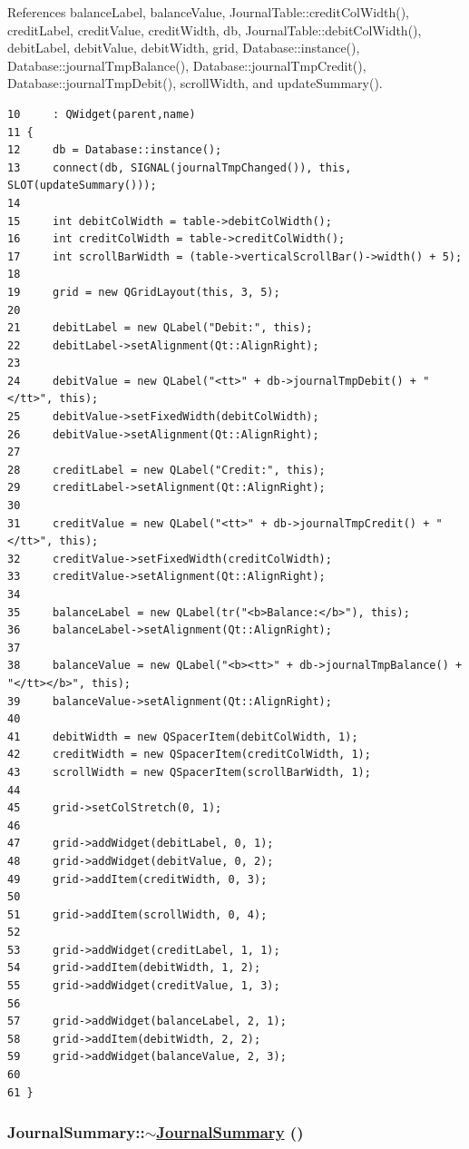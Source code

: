 References balance\-Label, balance\-Value, Journal\-Table::credit\-Col\-Width(), credit\-Label, credit\-Value, credit\-Width, db, Journal\-Table::debit\-Col\-Width(), debit\-Label, debit\-Value, debit\-Width, grid, Database::instance(), Database::journal\-Tmp\-Balance(), Database::journal\-Tmp\-Credit(), Database::journal\-Tmp\-Debit(), scroll\-Width, and update\-Summary().

\footnotesize\begin{verbatim}10     : QWidget(parent,name)
11 {
12     db = Database::instance();
13     connect(db, SIGNAL(journalTmpChanged()), this, SLOT(updateSummary()));
14     
15     int debitColWidth = table->debitColWidth();
16     int creditColWidth = table->creditColWidth();
17     int scrollBarWidth = (table->verticalScrollBar()->width() + 5);
18     
19     grid = new QGridLayout(this, 3, 5);
20     
21     debitLabel = new QLabel("Debit:", this);
22     debitLabel->setAlignment(Qt::AlignRight);
23     
24     debitValue = new QLabel("<tt>" + db->journalTmpDebit() + "</tt>", this);
25     debitValue->setFixedWidth(debitColWidth);
26     debitValue->setAlignment(Qt::AlignRight);
27     
28     creditLabel = new QLabel("Credit:", this);
29     creditLabel->setAlignment(Qt::AlignRight);
30     
31     creditValue = new QLabel("<tt>" + db->journalTmpCredit() + "</tt>", this);
32     creditValue->setFixedWidth(creditColWidth);
33     creditValue->setAlignment(Qt::AlignRight);
34     
35     balanceLabel = new QLabel(tr("<b>Balance:</b>"), this);
36     balanceLabel->setAlignment(Qt::AlignRight);
37     
38     balanceValue = new QLabel("<b><tt>" + db->journalTmpBalance() + "</tt></b>", this);
39     balanceValue->setAlignment(Qt::AlignRight);
40     
41     debitWidth = new QSpacerItem(debitColWidth, 1);
42     creditWidth = new QSpacerItem(creditColWidth, 1);
43     scrollWidth = new QSpacerItem(scrollBarWidth, 1);
44     
45     grid->setColStretch(0, 1);
46     
47     grid->addWidget(debitLabel, 0, 1);
48     grid->addWidget(debitValue, 0, 2);
49     grid->addItem(creditWidth, 0, 3);
50     
51     grid->addItem(scrollWidth, 0, 4);
52     
53     grid->addWidget(creditLabel, 1, 1);
54     grid->addItem(debitWidth, 1, 2);
55     grid->addWidget(creditValue, 1, 3);
56     
57     grid->addWidget(balanceLabel, 2, 1);
58     grid->addItem(debitWidth, 2, 2);
59     grid->addWidget(balanceValue, 2, 3);
60     
61 }
\end{verbatim}\normalsize 


\hypertarget{classJournalSummary_a1}{
\subsubsection[$\sim$JournalSummary]{\setlength{\rightskip}{0pt plus 5cm}Journal\-Summary::$\sim$\hyperlink{classJournalSummary}{Journal\-Summary} ()}}
\label{classJournalSummary_a1}



